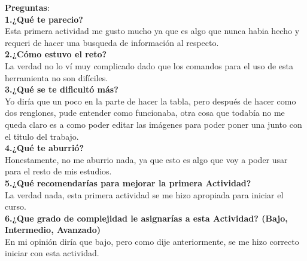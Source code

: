 \documentclass{article}
\begin{document}
\clearpage

\textbf{Preguntas}:\\
\textbf{1.¿Qué te parecio?}\\
Esta primera actividad me gusto mucho ya que es algo que nunca habia hecho y requeri de hacer una busqueda de información al respecto.\\

\textbf{2.¿Cómo estuvo el reto?}\\
La verdad no lo ví muy complicado dado que los comandos para el uso de esta herramienta no son difíciles.\\

\textbf{3.¿Qué se te dificultó más?}\\
Yo diría que un poco en la parte de hacer la tabla, pero después de hacer como dos renglones, pude entender como funcionaba, otra cosa que todabía no me queda claro es a como poder editar las imágenes para poder poner una junto con el titulo del trabajo.\\

\textbf{4.¿Qué te aburrió?}\\
Honestamente, no me aburrio nada, ya que esto es algo que voy a poder usar para el resto de mis estudios.\\

\textbf{5.¿Qué recomendarías para mejorar la primera Actividad?}\\
La verdad nada, esta primera actividad se me hizo apropiada para iniciar el curso.\\

\textbf{6.¿Que grado de complejidad le asignarías a esta Actividad? (Bajo, Intermedio, Avanzado)}\\
En mi opinión diría que bajo, pero como dije anteriormente, se me hizo correcto iniciar con esta actividad.
\end{document}

